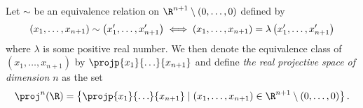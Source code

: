 \documentclass[a4paper]{article}
\begin{document}
    \begin{defn}

        Let $\sim$ be an equivalence relation on $\R^{n+1}\setminus \left( 0,
        \ldots, 0 \right)$ defined by
        \begin{equation}
            \notag
            \left( x_1, \ldots, x_{n+1} \right) \sim \left( x_1', \ldots, x_{n+1}' \right) 
            \iff \left( x_1, \ldots, x_{n+1} \right) = \lambda \left( x_1', \ldots, x_{n+1}' \right)
        \end{equation} 
        where $\lambda$ is some positive real number. We then denote the
        equivalence class of $\left( x_1, \ldots, x_{n+1} \right)$ by
        $\projp{x_1}{\ldots}{x_{n+1}}$ and define \emph{the real projective space
        of dimension $n$} as the set
        \begin{equation}
            \notag
            \proj^n(\R) = \left\{ \projp{x_1}{\ldots}{x_{n+1}} \mid \left( x_1, \ldots, x_{n+1} \right) 
            \in \R^{n+1} \setminus \left( 0, \ldots, 0 \right) \right\}.
        \end{equation}
    \end{defn}

            
\end{document}
